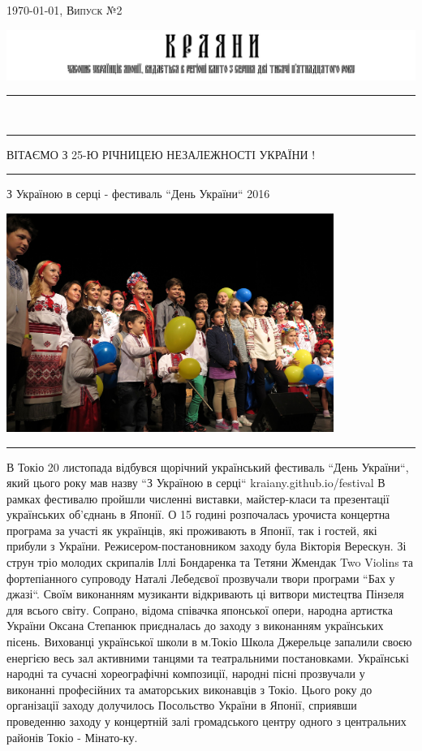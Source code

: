 \documentclass[10pt,a4paper]{article}
\newcommand{\HorRule}[1]{\noindent\rule{\linewidth}{#1}} %
\newcommand{\SepRule}{\noindent							 %
						\begin{center}
							\rule{250pt}{1pt}
						\end{center}
						}
\newcommand{\JournalIssue}[1]{%
		\hfill \textsc{\mydate \today, Випуск №2}
		\par \normalsize \normalfont}
\newcommand{\NewsItem}[1]{%
		\usefont{T2A}{iwona}{m}{n} 
		\large #1 \vspace{4pt}
		\par \normalsize \normalfont}
\begin{document}
\JournalIssue{1}
		\includegraphics[width=1\textwidth]{../common_files/chasopys_logo}
\noindent\HorRule{3pt} \\[-0.75\baselineskip]
\HorRule{1pt}

\begin{center}
ВІТАЄМО З 25-Ю РІЧНИЦЕЮ НЕЗАЛЕЖНОСТІ УКРАЇНИ !
\end{center}

\SepRule

\vspace{0.1cm}

\begin{center}
\NewsItem{З Україною в серці - фестиваль ``День України`` 2016}	
\includegraphics[width=0.8\textwidth]{images/18}
\end{center}
\SepRule	
\begin{multicols}{3}
В Токіо 20 листопада відбувся щорічний український фестиваль ``День України``, який цього року мав назву ``З Україною в серці`` kraiany.github.io/festival В рамках фестивалю пройшли численні виставки, майстер-класи та презентації українських об'єднань в Японії. О 15 годині розпочалась урочиста концертна програма за участі як українців, які проживають в Японії, так і гостей, які прибули з України. Режисером-постановником заходу була Вікторія Верескун. Зі струн тріо молодих скрипалів Іллі Бондаренка та Тетяни Жмендак Two Violins та фортепіанного супроводу Наталі Лебедєвої прозвучали твори програми ``Бах у джазі``. Своїм виконанням музиканти відкривають ці витвори мистецтва Пінзеля для всього світу. Сопрано, відома співачка японської опери, народна артистка України Оксана Степанюк приєдналась до заходу з виконанням українських пісень. Вихованці української школи в м.Токіо Школа Джерельце запалили своєю енергією весь зал активними танцями та театральними постановками. Українські народні та сучасні хореографічні композиції, народні пісні прозвучали у виконанні професійних та аматорських виконавців з Токіо. Цього року до організації заходу долучилось Посольство України в Японії, сприявши проведенню заходу у концертній залі громадського центру одного з центральних районів Токіо - Мінато-ку.
\end{multicols}
\end{document}
